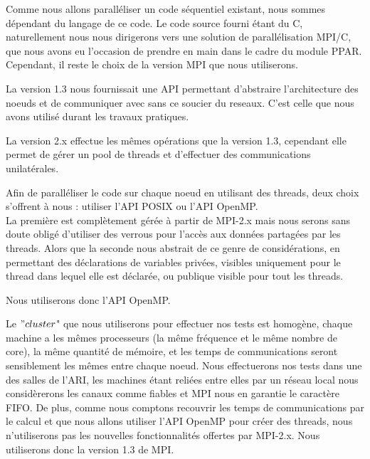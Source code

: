 \par Comme nous allons paralléliser un code séquentiel existant,
nous sommes dépendant du langage de ce code. Le code source fourni 
étant du C, naturellement nous nous dirigerons vers une solution 
de parallélisation MPI/C, que nous avons eu l'occasion de prendre 
en main dans le cadre du module PPAR. Cependant, il reste le choix de la 
version MPI que nous utiliserons.\\
\par La version 1.3 nous fournissait une API permettant d'abstraire 
l'architecture des noeuds et de communiquer avec sans ce soucier du reseaux. C'est
celle que nous avons utilisé durant les travaux pratiques.\\
\par La version 2.x effectue les mêmes opérations que la version 1.3,
cependant elle permet de gérer un pool de threads et d'effectuer des communications unilatérales.\\
\par Afin de paralléliser le code sur chaque noeud en utilisant des threads,
deux choix s'offrent à nous : utiliser l'API POSIX ou l'API OpenMP.\\
La première est complètement gérée à partir de MPI-2.x mais nous serons sans doute
obligé d'utiliser des verrous pour l'accès aux données partagées par les threads.
Alors que la seconde nous abstrait de ce genre de considérations, en permettant 
des déclarations de variables privées, visibles uniquement pour le thread dans lequel elle est déclarée, 
ou publique visible pour tout les threads.\\

\par Nous utiliserons donc l'API OpenMP.\\

\par Le $"cluster$" que nous utiliserons pour effectuer nos tests 
est homogène, chaque machine a les mêmes processeurs (la même fréquence et le même nombre de core),
la même quantité de mémoire, et les temps de communications seront sensiblement 
les mêmes entre chaque noeud. Nous effectuerons nos tests dans une des salles 
de l'ARI, les machines étant reliées entre elles par un réseau local nous considèrerons 
les canaux comme fiables et MPI nous en garantie le caractère FIFO.
De plus, comme nous comptons recouvrir les temps
de communications par le calcul et que nous allons utiliser l'API OpenMP 
pour créer des threads, nous n'utiliserons pas les nouvelles fonctionnalités offertes
par MPI-2.x. Nous utiliserons donc la version 1.3 de MPI.\\


